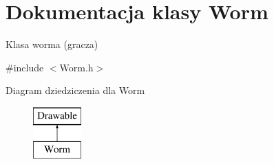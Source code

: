 \hypertarget{class_worm}{}\section{Dokumentacja klasy Worm}
\label{class_worm}


Klasa worma (gracza)  




{\ttfamily \#include $<$Worm.\+h$>$}

Diagram dziedziczenia dla Worm\begin{figure}[H]
\begin{center}
\leavevmode
\includegraphics[height=2.000000cm]{class_worm}
\end{center}
\end{figure}
